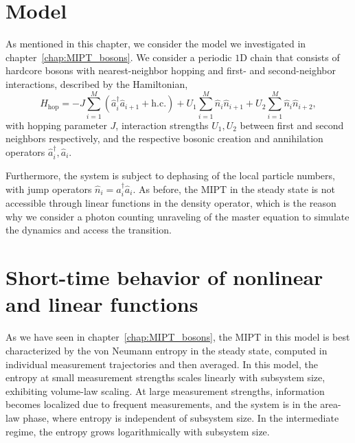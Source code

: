 \section{Model}

As mentioned in this chapter, we consider the model we investigated in chapter~\ref{chap:MIPT_bosons}. We consider a periodic $1$D chain that consists of hardcore bosons with nearest-neighbor hopping and first- and second-neighbor interactions, described by the Hamiltonian,
\begin{equation}
\hat{H}_\text{hop} =-J \sum\limits_{i=1}^{M} ( \hat{a}^{\dagger}_i \hat{a}_{i+1} + \textrm{h.c.}) + U_1\sum\limits_{i=1}^{M} \hat{n}_i \hat{n}_{i+1}
+ U_2\sum\limits_{i=1}^{M} \hat{n}_i \hat{n}_{i+2},
\end{equation}
with hopping parameter $J$, interaction strengths $U_1, U_2$ between first and second neighbors respectively, and the respective bosonic creation and annihilation operators $\hat{a}^\dagger_i, \hat{a}_i$. 

Furthermore, the system is subject to dephasing of the local particle numbers, with jump operators $\hat{n}_i = \hat{a}^\dagger_i \hat{a}_i$. As before, the MIPT in the steady state is not accessible through linear functions in the density operator, which is the reason why we consider a photon counting unraveling of the master equation to simulate the dynamics and access the transition. 

\section{Short-time behavior of nonlinear and linear functions}

As we have seen in chapter~\ref{chap:MIPT_bosons}, the MIPT in this model is best characterized by the von Neumann entropy in the steady state, computed in individual measurement trajectories and then averaged. In this model, the entropy at small measurement strengths scales linearly with subsystem size, exhibiting volume-law scaling. At large measurement strengths, information becomes localized due to frequent measurements, and the system is in the area-law phase, where entropy is independent of subsystem size. In the intermediate regime, the entropy grows logarithmically with subsystem size. 

